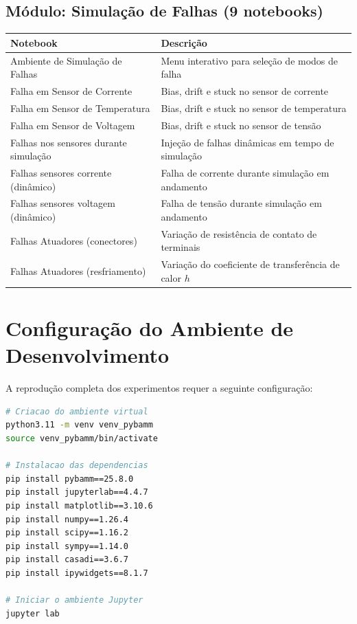 \documentclass[
    12pt,
    openright,
    twoside,
    a4paper,
    brazil,
    english
]{abntex2}
\begin{document}
\begin{apendicesenv}
\section{Módulo: Simulação de Falhas (9 notebooks)}

\begin{longtable}{lp{10cm}}
  \toprule
  \textbf{Notebook} & \textbf{Descrição} \\
  \midrule
  Ambiente de Simulação de Falhas    & Menu interativo para seleção de modos de falha \\
  Falha em Sensor de Corrente        & Bias, drift e stuck no sensor de corrente \\
  Falha em Sensor de Temperatura     & Bias, drift e stuck no sensor de temperatura \\
  Falha em Sensor de Voltagem        & Bias, drift e stuck no sensor de tensão \\
  Falhas nos sensores durante simulação & Injeção de falhas dinâmicas em tempo de simulação \\
  Falhas sensores corrente (dinâmico) & Falha de corrente durante simulação em andamento \\
  Falhas sensores voltagem (dinâmico) & Falha de tensão durante simulação em andamento \\
  Falhas Atuadores (conectores)      & Variação de resistência de contato de terminais \\
  Falhas Atuadores (resfriamento)    & Variação do coeficiente de transferência de calor $h$ \\
  \bottomrule
\end{longtable}

\chapter{Configuração do Ambiente de Desenvolvimento}
\label{apend:ambiente}

A reprodução completa dos experimentos requer a seguinte configuração:

\begin{lstlisting}[language=bash, caption={Configuração do ambiente virtual Python.}]
# Criacao do ambiente virtual
python3.11 -m venv venv_pybamm
source venv_pybamm/bin/activate

# Instalacao das dependencias
pip install pybamm==25.8.0
pip install jupyterlab==4.4.7
pip install matplotlib==3.10.6
pip install numpy==1.26.4
pip install scipy==1.16.2
pip install sympy==1.14.0
pip install casadi==3.6.7
pip install ipywidgets==8.1.7

# Iniciar o ambiente Jupyter
jupyter lab
\end{lstlisting}

\end{apendicesenv}

\printindex
\end{document}

